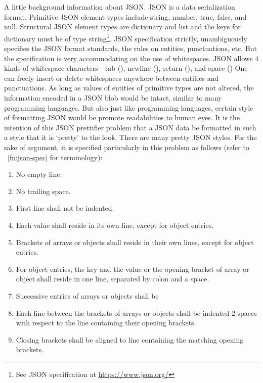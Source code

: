A little background information about JSON\@.
JSON is a data serialization format.
Primitive JSON element types include string, number, true, false, and null.
Structural JSON element types are dictionary and list and the keys for dictionary
must be of type string\footnote{\label{fn:json-spec}See JSON specification
at \url{https://www.json.org/}}.
JSON specification strictly, unambiguously specifies the JSON format standards, the rules on
entities, punctuations, etc.
But the specification is very accommodating on the use of whitespaces.
JSON allows $4$ kinds of whitespace characters---tab (), newline (),
return (), and space ()
One can freely insert or delete whitespaces anywhere between entities and punctuations.
As long as values of entities of primitive types are not altered, the information encoded in a
JSON blob would be intact, similar to many programming languages.
But also just like programming languages,
certain style of formatting JSON would be promote readabilities to human eyes.
It is the intention of this JSON prettifier problem that a JSON data be formatted in such a style
that it is `pretty' to the look.
There are many pretty JSON styles.
For the sake of argument, it is specified particularly in this problem as follows
(refer to ~\autoref{fn:json-spec} for terminology):
\begin{enumerate}
    \label{json-style-spec}
    \item No empty line.
    \item No trailing space.
    \item First line shall not be indented.
    \item Each value shall reside in its own line, except for object entries.
    \item Brackets of arrays or objects shall reside in their own lines, except for object entries.
    \item For object entries, the key and the value or the opening bracket of array or object
    shall reside in one line, separated by colon and a space.
    \item Successive entries of arrays or objects shall be
    \item Each line between the brackets of arrays or objects shall be indented $2$ spaces with
    respect to the line containing their opening brackets.
    \item Closing brackets shall be aligned to line containing the matching opening brackets.
\end{enumerate}

